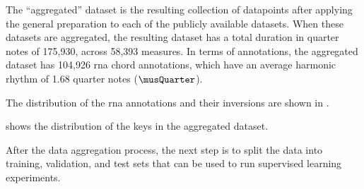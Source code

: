 
The ``aggregated'' dataset is the resulting collection of
datapoints after applying the general preparation to each of
the publicly available datasets. When these datasets are
aggregated, the resulting dataset has a total duration in
quarter notes of 175,930, across 58,393 measures. In terms
of annotations, the aggregated dataset has 104,926 \gls{rna}
chord annotations, which have an average harmonic rhythm of
1.68 quarter notes ($\musQuarter$).

The distribution of the \gls{rna} annotations and their
inversions are shown in .



 shows the distribution of
the keys in the aggregated dataset. 

After the data aggregation process, the next step is to
split the data into training, validation, and test sets that
can be used to run supervised learning experiments.
